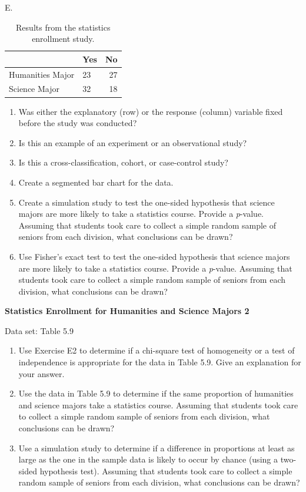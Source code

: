 \documentclass[
]{report}
\newcounter{excount}
\renewcommand{\theexcount}{E\arabic{excount}}
\begin{document}
\begin{list}{\theexcount.}{ \setlength{\itemsep}{0.5em}}
\begin{table}[!h]
\centering
\caption{\label{tab:tab9}Results from the statistics enrollment study.}
\centering
\begin{tabular}[t]{llr}
\toprule
  & Yes & No\\
\midrule
Humanities Major & 23 & 27\\
Science Major & 32 & 18\\
\bottomrule
\end{tabular}
\end{table}



  \begin{enumerate}
    \item Was either the explanatory (row) or the response (column) variable fixed before the study was conducted?
    \item Is this an example of an experiment or an observational study?
    \item Is this a cross-classification, cohort, or case-control study?
    \item Create a segmented bar chart for the data.
    \item Create a simulation study to test the one-sided hypothesis that science majors are more likely to take a statistics course. Provide a \textit{p}-value. Assuming that students took care to collect a simple random sample of seniors from each division, what conclusions can be drawn?
    \item Use Fisher’s exact test to test the one-sided hypothesis that science majors are more likely to take a statistics course. Provide a \textit{p}-value. Assuming that students took care to collect a simple random sample of seniors from each division, what conclusions can be drawn?
  \end{enumerate}

  \item \textbf{Statistics Enrollment for Humanities and Science Majors 2}    

  Data set: Table 5.9    
  \begin{enumerate}
    \item Use Exercise E2 to determine if a chi-square test of homogeneity or a test of independence is appropriate for the data in Table 5.9. Give an explanation for your answer.
    \item Use the data in Table 5.9 to determine if the same proportion of humanities and science majors take a statistics course. Assuming that students took care to collect a simple random sample of seniors from each division, what conclusions can be drawn?
    \item Use a simulation study to determine if a difference in proportions at least as large as the one in the sample data is likely to occur by chance (using a two-sided hypothesis test). Assuming that students took care to collect a simple random sample of seniors from each division, what conclusions can be drawn?
  \end{enumerate}


\end{list}
\end{document}
